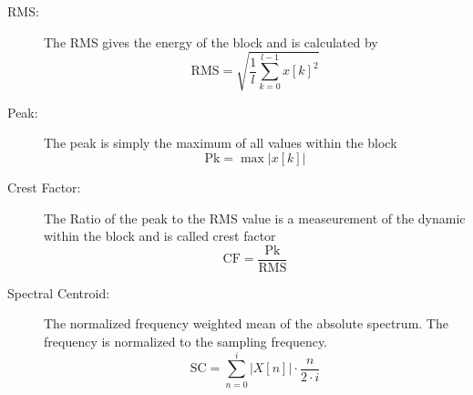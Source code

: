 \begin{description}
    \item[RMS:]
        The RMS gives the energy of the block and is calculated by
        \[
            \mathrm{RMS} = \sqrt{\frac{1}{l}\sum_{k=0}^{l-1}{x[k]^2}}
        \]
    \item[Peak:]
        The peak is simply the maximum of all values within the block
        \[
            \mathrm{Pk} = \max{|x[k]|}
        \]
    \item[Crest Factor:]
        The Ratio of the peak to the RMS value is a measeurement of the dynamic within the block and is called crest factor
        \[
            \mathrm{CF} = \frac{\mathrm{Pk}}{\mathrm{RMS}}
        \]
    \item[Spectral Centroid:]
        The normalized frequency weighted mean of the absolute spectrum. The frequency is normalized to the sampling frequency.
        \[
            \mathrm{SC} = \sum_{n=0}^{i}{|X[n]| \cdot \frac{n}{2 \cdot i}}
        \]
        

\end{description}
